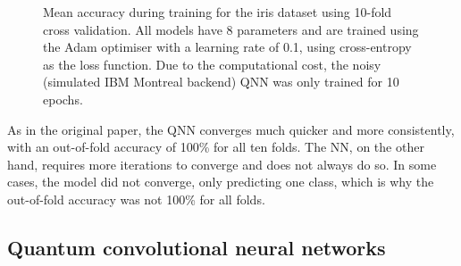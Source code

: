 \begin{figure}
    \centering
    \caption{Mean accuracy during training for the iris dataset using 10-fold cross validation. All models have 8 parameters and are trained using the Adam optimiser with a learning rate of 0.1, using cross-entropy as the loss function. Due to the computational cost, the noisy (simulated IBM Montreal backend) QNN was only trained for 10 epochs.}
    \label{fig:iris_training}
\end{figure}


As in the original paper, the QNN converges much quicker and more consistently, with an out-of-fold accuracy of 100\% for all ten folds. The NN, on the other hand, requires more iterations to converge and does not always do so. In some cases, the model did not converge, only predicting one class, which is why the out-of-fold accuracy was not 100\% for all folds.


\subsection{Quantum convolutional neural networks}

